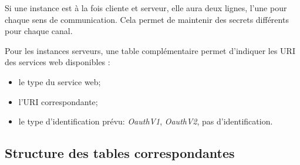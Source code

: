 Si une instance est à la fois cliente et serveur, elle aura deux lignes, l'une pour chaque sens de communication. Cela permet de maintenir des secrets différents pour chaque canal.

Pour les instances \og serveurs\fg{}, une table complémentaire permet d'indiquer les URI des services web disponibles :
\begin{itemize}
\item le type du service web;
\item l'URI correspondante;
\item le type d'identification prévu: \textit{OauthV1}, \textit{OauthV2}, pas d'identification.
\end{itemize}

\subsection{Structure des tables correspondantes}

